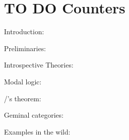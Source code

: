 {\color{red}
\section{TO DO Counters}
Introduction: \theIntroductionCounter

Preliminaries: \thePreliminariesCounter

Introspective Theories: \theIntrospectiveTheoryCounter

Modal logic: \theModalCounter

\Loeb/'s theorem: \theLoebCounter

Geminal categories: \theGLCategoryCounter

Examples in the wild: \theModelsCounter

}